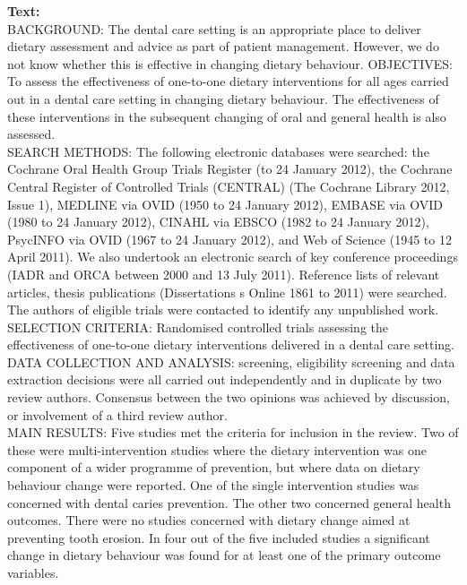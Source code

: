 \begin{figure*}[ht!]
    \centering
    \begin{tcolorbox}[
        enhanced,                  %
        colframe=blue!70!black,    %
        colback=blue!5,            %
        coltitle=white,            %
        colbacktitle=blue!70!black,%
        width=\textwidth,          %
        arc=4mm,                   %
        boxrule=1mm,               %
        drop shadow,               %
        title=Effectiveness of Dietary Interventions in Dental Settings, %
        fonttitle=\bfseries\large  %
    ]

    \textbf{Text:}\\[1em]
    BACKGROUND: The dental care setting is an appropriate place to deliver dietary assessment and advice as part of patient management. However, we do not know whether this is effective in changing dietary behaviour. OBJECTIVES: To assess the effectiveness of one-to-one dietary interventions for all ages carried out in a dental care setting in changing dietary behaviour. The effectiveness of these interventions in the subsequent changing of oral and general health is also assessed.\\[0.5em]
    SEARCH METHODS: The following electronic databases were searched: the Cochrane Oral Health Group Trials Register (to 24 January 2012), the Cochrane Central Register of Controlled Trials (CENTRAL) (The Cochrane Library 2012, Issue 1), MEDLINE via OVID (1950 to 24 January 2012), EMBASE via OVID (1980 to 24 January 2012), CINAHL via EBSCO (1982 to 24 January 2012), PsycINFO via OVID (1967 to 24 January 2012), and Web of Science (1945 to 12 April 2011). We also undertook an electronic search of key conference proceedings (IADR and ORCA between 2000 and 13 July 2011). Reference lists of relevant articles, thesis publications (Dissertations s Online 1861 to 2011) were searched. The authors of eligible trials were contacted to identify any unpublished work.\\[0.5em]
    SELECTION CRITERIA: Randomised controlled trials assessing the effectiveness of one-to-one dietary interventions delivered in a dental care setting. DATA COLLECTION AND ANALYSIS: screening, eligibility screening and data extraction decisions were all carried out independently and in duplicate by two review authors. Consensus between the two opinions was achieved by discussion, or involvement of a third review author.\\[0.5em]
    MAIN RESULTS: Five studies met the criteria for inclusion in the review. Two of these were multi-intervention studies where the dietary intervention was one component of a wider programme of prevention, but where data on dietary behaviour change were reported. One of the single intervention studies was concerned with dental caries prevention. The other two concerned general health outcomes. There were no studies concerned with dietary change aimed at preventing tooth erosion. In four out of the five included studies a significant change in dietary behaviour was found for at least one of the primary outcome variables.\\[0.5em]

\end{tcolorbox}
\end{figure*}
